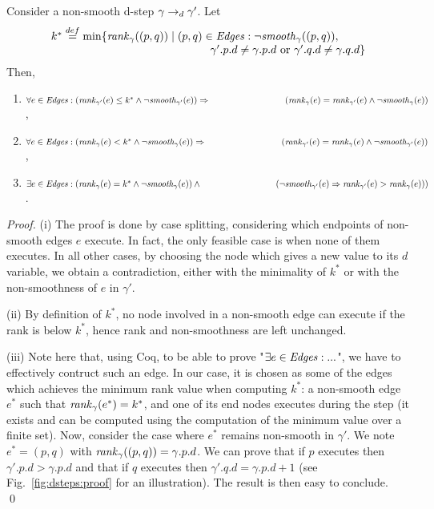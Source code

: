 \begin{lemma}\label{lemma:dsteps:nonsmooth} Consider a non-smooth d-step $\gamma \rightarrow_d \gamma'$.   Let
  $$\begin{array}{l} k^* \isdef \min \{ \crank{\gamma}{(p,q)} \mid (p, q) \in \edges:
    \neg \csmooth{\gamma}{(p,q)}, \\
    \hspace{5cm} \gamma'.p.d \not=\gamma.p.d \mbox{ or } \gamma'.q.d \not= \gamma.q.d \}
    \end{array}$$
  Then,
  \begin{enumerate}[label=(\roman*)]
  \item $\forall e \in \edges: (\crank{\gamma'}{e} \le k^* \wedge \neg \csmooth{\gamma'}{e}) \Rightarrow \\
    \hspace*{3cm} (\crank{\gamma}{e} = \crank{\gamma'}{e} \wedge \neg \csmooth{\gamma}{e})$,
  \item $\forall e \in \edges: (\crank{\gamma}{e} < k^* \wedge \neg \csmooth{\gamma}{e}) \Rightarrow \\
    \hspace*{3cm} (\crank{\gamma'}{e} = \crank{\gamma}{e} \wedge \neg \csmooth{\gamma'}{e})$,
  \item $\exists e \in \edges: (\crank{\gamma}{e} = k^* \wedge \neg \csmooth{\gamma}{e}) \wedge \\
    \hspace*{3cm} (\neg \csmooth{\gamma'}{e} \Rightarrow \crank{\gamma'}{e} > \crank{\gamma}{e}))$.
  \end{enumerate}
\end{lemma}
\begin{proof}
  (i) The proof is done by case splitting, considering which endpoints
  of non-smooth edges $e$ execute. In fact, the only feasible case is
  when none of them executes.  In all other cases, by choosing the
  node which gives a new value to its $d$ variable, we obtain a
  contradiction, either with the minimality of $k^*$ or with the
  non-smoothness of $e$ in $\gamma'$.

  (ii) By definition of $k^*$, no node involved in a non-smooth edge
  can execute if the rank is below $k^*$, hence rank and
  non-smoothness are left unchanged.

  (iii) Note here that, using Coq, to be able to prove "$\exists e \in
  \mathit{Edges}: ...$", we have to effectively contruct such an edge. In our
  case, it is chosen as some of the edges which achieves the minimum
  rank value when computing $k^*$: a non-smooth edge $e^*$ such that
  $\mathit{rank}_{\gamma}(e^*) = k^*$, and one of its end nodes executes
  during the step (it exists and can be computed using the computation
  of the minimum value over a finite set). Now, consider the case
  where $e^*$ remains non-smooth in $\gamma'$. We note $e^*=(p, q)$
  with $\mathit{rank}_{\gamma}((p, q)) = \gamma.p.d$. We can prove that if $p$
  executes then $\gamma'.p.d > \gamma.p.d$ and that if $q$ executes
  then $\gamma'.q.d = \gamma.p.d + 1$ (see Fig.~\ref{fig:dsteps:proof}
  for an illustration). The result is then easy to conclude.
  \qed
\end{proof}


